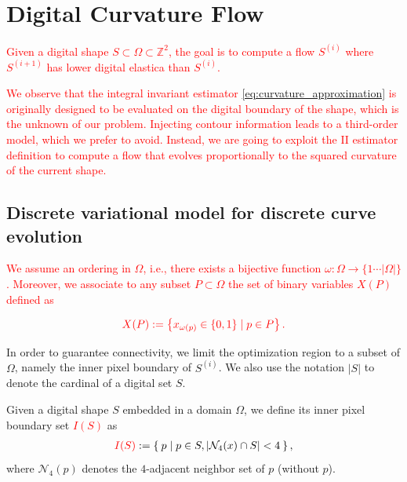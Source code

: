 \documentclass[smallextended]{svjour3}       %
\newcommand{\revision}[1]{\textcolor{red}{#1}}
\begin{document}
\section{Digital Curvature Flow}

\revision{
Given a digital shape $S \subset \Omega \subset \mathbb{Z}^2$, the goal is to compute a flow $S^{(i)}$ where $S^{(i+1)}$ has lower digital elastica than $S^{(i)}$.}

\revision{We observe that the integral invariant estimator \eqref{eq:curvature_approximation} is originally designed to be evaluated on the digital boundary of the shape, which is the unknown of our problem. Injecting contour information leads to a third-order model, which we prefer to avoid. Instead, we are going to exploit the II estimator definition to compute a flow that evolves proportionally to the squared curvature of the current shape.}

\subsection{Discrete variational model for discrete curve evolution}

\revision{We assume an ordering in $\Omega$, i.e., there exists a bijective function $\omega : \Omega \rightarrow \{1 \cdots |\Omega| \}$. Moreover, we associate to any subset $P \subset \Omega$ the set of binary variables $X(P)$ defined as}

\begin{align*}
	\revision{X(P) := \left\{ x_{\omega(p)} \in \{0,1\} \; | \; p \in P \right\}.}
\end{align*}

In order to guarantee connectivity, we limit the optimization region to a subset of $\Omega$, namely the inner pixel boundary of  $S^{(i)}$. We also use the notation $| S |$ to denote the cardinal of a digital set $S$.

\begin{definition}

Given a digital shape $S$ embedded in a domain $\Omega$, we define its inner pixel boundary set \revision{$I(S)$} as
\begin{align*}
	\revision{I(S)} := \left\{ \: p \; | \; p \in S, |\mathcal{N}_4(x) \cap S|<4 \: \right\},
\end{align*}
where $\mathcal{N}_4(p)$ denotes the $4$-adjacent neighbor set of $p$ (without $p$).
\end{definition}
\end{document}
